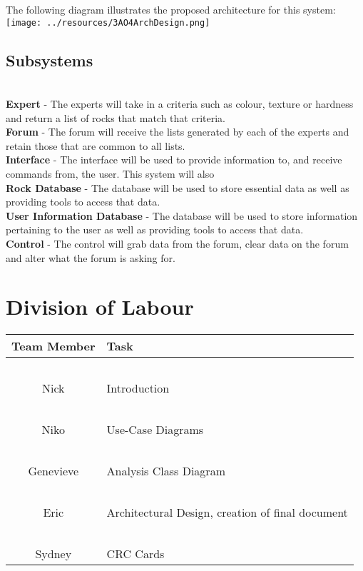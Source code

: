 \documentclass[titlepage]{article}
\begin{document}
The following diagram illustrates the proposed architecture for this system:\\

\texttt{[image: ../resources/3AO4ArchDesign.png]}

\subsection{Subsystems}~\\

\textbf{Expert} - The experts will take in a criteria such as colour, texture or hardness and return a list of rocks that match that criteria.\\

\textbf{Forum} - The forum will receive the lists generated by each of the experts and retain those that are common to all lists.\\

\textbf{Interface} - The interface will be used to provide information to, and receive commands from, the user. This system will also \\

\textbf{Rock Database} - The database will be used to store essential data as well as providing tools to access that data.\\

\textbf{User Information Database} - The database will be used to store information pertaining to the user as well as providing tools to access that data.\\

\textbf{Control} - The control will grab data from the forum, clear data on the forum and alter what the forum is asking for.

\newpage
\appendix
\section{Division of Labour}
\begin{center}
\begin{tabular}{c | l }
	\textbf{Team Member}	&\textbf{Task} 								\\ \hline
	~\\
	Nick					&Introduction								\\
	~\\
	Niko					&Use-Case Diagrams						\\
	~\\
	Genevieve			&Analysis Class Diagram						\\
	~\\
	Eric					&Architectural Design, creation of final document	\\
	~\\
	Sydney				&CRC Cards								\\
\end{tabular}
\end{center}
\end{document}
